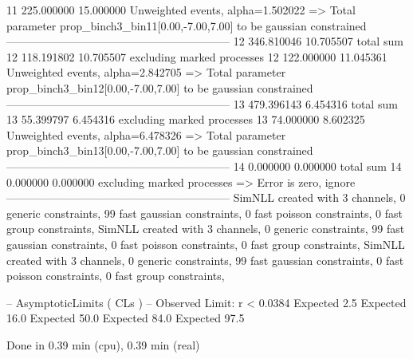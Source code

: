 11         225.000000      15.000000       Unweighted events, alpha=1.502022
  => Total parameter prop_binch3_bin11[0.00,-7.00,7.00] to be gaussian constrained
------------------------------------------------------------
12         346.810046      10.705507       total sum                     
12         118.191802      10.705507       excluding marked processes    
12         122.000000      11.045361       Unweighted events, alpha=2.842705
  => Total parameter prop_binch3_bin12[0.00,-7.00,7.00] to be gaussian constrained
------------------------------------------------------------
13         479.396143      6.454316        total sum                     
13         55.399797       6.454316        excluding marked processes    
13         74.000000       8.602325        Unweighted events, alpha=6.478326
  => Total parameter prop_binch3_bin13[0.00,-7.00,7.00] to be gaussian constrained
------------------------------------------------------------
14         0.000000        0.000000        total sum                     
14         0.000000        0.000000        excluding marked processes    
  => Error is zero, ignore      
------------------------------------------------------------
SimNLL created with 3 channels, 0 generic constraints, 99 fast gaussian constraints, 0 fast poisson constraints, 0 fast group constraints, 
SimNLL created with 3 channels, 0 generic constraints, 99 fast gaussian constraints, 0 fast poisson constraints, 0 fast group constraints, 
SimNLL created with 3 channels, 0 generic constraints, 99 fast gaussian constraints, 0 fast poisson constraints, 0 fast group constraints, 

 -- AsymptoticLimits ( CLs ) --
Observed Limit: r < 0.0384
Expected  2.5%
Expected 16.0%
Expected 50.0%
Expected 84.0%
Expected 97.5%

Done in 0.39 min (cpu), 0.39 min (real)
